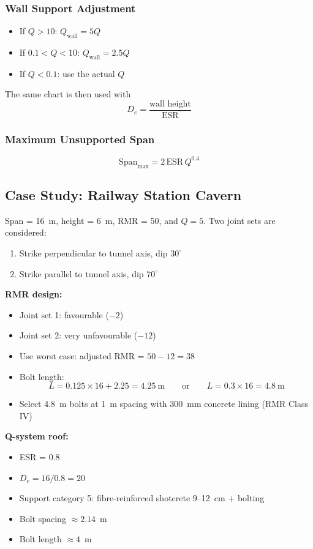 \documentclass[a4paper,12pt]{article}
\begin{document}
\subsubsection{Wall Support Adjustment}
\begin{itemize}
    \item If $Q > 10$: $Q_{\text{wall}} = 5Q$
    \item If $0.1 < Q < 10$: $Q_{\text{wall}} = 2.5Q$
    \item If $Q < 0.1$: use the actual $Q$
\end{itemize}
The same chart is then used with
\[
D_e = \frac{\text{wall height}}{\text{ESR}}
\]

\subsubsection{Maximum Unsupported Span}
\[
\mathrm{Span}_{\max} = 2 \, \mathrm{ESR} \, Q^{0.4}
\]

\subsection{Case Study: Railway Station Cavern}
Span = 16~m, height = 6~m, RMR = 50, and $Q = 5$. Two joint sets are considered:
\begin{enumerate}
    \item Strike perpendicular to tunnel axis, dip $30^\circ$
    \item Strike parallel to tunnel axis, dip $70^\circ$
\end{enumerate}

\textbf{RMR design:}
\begin{itemize}
    \item Joint set 1: favourable ($-2$)
    \item Joint set 2: very unfavourable ($-12$)
    \item Use worst case: adjusted RMR = $50 - 12 = 38$
    \item Bolt length:
    \[
    L = 0.125\times16 + 2.25 = 4.25~\text{m}
    \qquad \text{or} \qquad
    L = 0.3\times16 = 4.8~\text{m}
    \]
    \item Select 4.8~m bolts at 1~m spacing with 300~mm concrete lining (RMR Class IV)
\end{itemize}

\textbf{Q-system roof:}
\begin{itemize}
    \item ESR = 0.8
    \item $D_e = 16/0.8 = 20$
    \item Support category 5: fibre-reinforced shotcrete 9--12~cm + bolting
    \item Bolt spacing $\approx 2.14$~m
    \item Bolt length $\approx 4$~m
\end{itemize}
\end{document}
